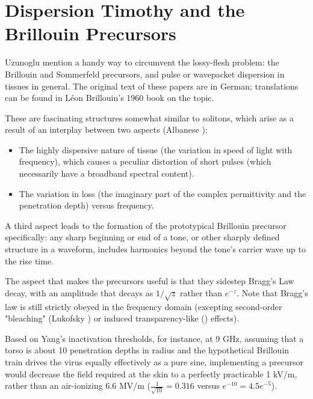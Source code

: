 \documentclass[paper.tex]{subfiles}
\begin{document}
\section{Dispersion Timothy and the Brillouin Precursors}

Uzunoglu \cite{Theoretical2020} mention a handy way to circumvent the lossy-flesh problem: the Brillouin and Sommerfeld precursors\footnotemark, and pulse or wavepacket dispersion in tissues in general. The original text of these papers are in German; translations can be found in Léon Brillouin's 1960 book\cite{Wave1960} on the topic.




These are fascinating structures somewhat similar to solitons, which arise as a result of an interplay between two aspects (Albanese 
\cite{Shortrisetime1989}): 

\begin{itemize}
	\item The highly dispersive nature of tissue (the variation in speed of light with frequency), which causes a peculiar distortion of short pulses (which necessarily have a broadband spectral content).
	\item The variation in loss (the imaginary part of the complex permittivity and the penetration depth) versus frequency. 
\end{itemize}


A third aspect leads to the formation of the prototypical Brillouin precursor specifically: any sharp 
beginning or end of a tone, or other sharply defined structure in a waveform, includes harmonics beyond the tone's carrier wave up to the rise time.

The aspect that makes the precursors useful is that they sidestep Bragg's Law decay, with an amplitude that decays as $1/\sqrt{z}$ rather than $e^{-z}$. Note that Bragg's law is still strictly obeyed in the frequency domain (excepting second-order "bleaching" (Lukofsky \cite{Can}) or induced transparency-like (\cite{Electromagnetically1997}) effects).

Based on Yang's inactivation thresholds, for instance, at 9 GHz, assuming that a torso is about 10 penetration depths in radius and the hypothetical Brillouin train drives the virus equally effectively as a pure sine, implementing a precursor would decrease the field required at the skin to a perfectly practicable 1 kV/m, rather than an air-ionizing 6.6 MV/m ($\frac{1}{\sqrt{10}}=0.316$ versus $e^{-10}=4.5e^{-5}$). 
\end{document}
